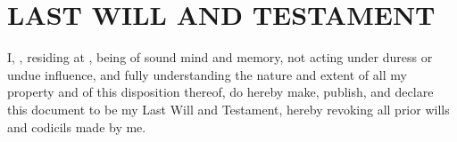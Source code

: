 
\section*{\centering LAST WILL AND TESTAMENT}
\vspace*{0.5cm}

I, \TestatorName{}, residing at \TestatorAddress{}, being of sound mind and memory, not acting under duress or undue influence, and fully understanding the nature and extent of all my property and of this disposition thereof, do hereby make, publish, and declare this document to be my Last Will and Testament, hereby revoking all prior wills and codicils made by me.

